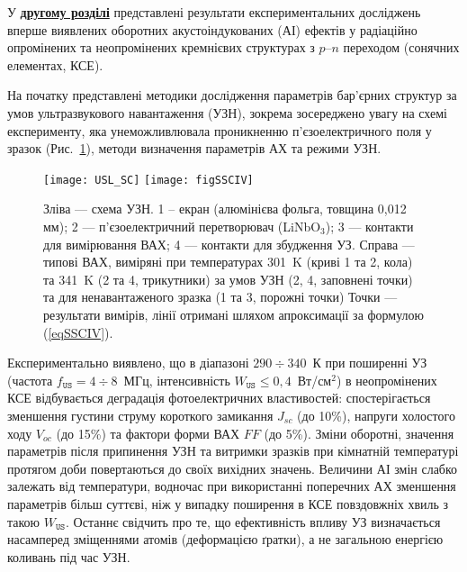 \documentclass[a5paper,10pt,twoside,openany,article]{memoir} %
\begin{document}
\mainmatter                   %


У  \underline{\textbf{другому розділі}} представлені результати експериментальних досліджень вперше виявлених оборотних акустоіндукованих (АІ) ефектів у радіаційно опромінених та неопромінених кремнієвих структурах з  $p$--$n$ переходом (сонячних елементах, КСЕ).

На початку представлені методики дослідження параметрів бар'єрних структур за умов ультразвукового навантаження (УЗН),
зокрема зосереджено увагу на схемі експерименту, яка унеможливлювала проникненню п'єзоелектричного поля у зразок (Рис.~\ref{USL_SC}), методи визначення параметрів АХ та режими УЗН.


\begin{figure}[ht]
\center
\texttt{[image: USL\_SC]} \hfill
\texttt{[image: figSSCIV]}
\caption{\label{USL_SC}
Зліва --- схема УЗН.
1 --  екран (алюмінієва фольга, товщина 0,012 мм);
2 --- п'єзоелектричний перетворювач (LiNbO$_3$);
3 --- контакти для вимірювання ВАХ;
4 --- контакти для збудження УЗ.
Справа --- типові ВАХ, виміряні при температурах 301~K (криві 1 та 2, кола) та 341~K (2 та 4, трикутники)
за умов УЗН (2, 4, заповнені точки) та для ненавантаженого зразка (1 та 3, порожні точки)
Точки --- результати вимірів, лінії отримані шляхом апроксимації за формулою (\ref{eqSSCIV}).
}%
\end{figure}

Експериментально виявлено, що в діапазоні $290\div340$~К при поширенні УЗ (частота $f_\mathtt{US}=4\div8$~МГц, інтенсивність $W_\mathtt{US}\leq0,4$~Вт/см$^2$) в неопромінених КСЕ відбувається деградація
фотоелектричних властивостей:
спостерігається зменшення густини струму короткого замикання $J_{sc}$ (до 10\%), напруги холостого ходу $V_{oc}$ (до 15\%) та фактори форми ВАХ $F\!F$ (до 5\%).
Зміни оборотні, значення параметрів  після припинення УЗН  та витримки зразків при кімнатній температурі протягом доби повертаються до своїх вихідних значень.
Величини АІ змін слабко залежать від температури, водночас при використанні поперечних АХ зменшення параметрів більш суттєві, ніж у випадку поширення в КСЕ повздовжніх хвиль з такою  $W_\mathtt{US}$.
Останнє свідчить про те, що ефективність впливу УЗ визначається насамперед зміщеннями атомів (деформацією ґратки), а не загальною енергією коливань під час УЗН.
\end{document}
